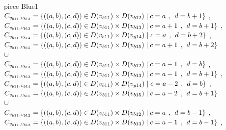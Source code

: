 \\ piece Blue1 
\\$C_{v_{b11},v_{b12}}=\{((a,b),(c,d))\in D(v_{b11}) \times D(v_{b12})\mid c = a   \hspace{1ex} , \hspace{1ex}  d = b + 1 \}$ , 
\\$C_{v_{b11},v_{b13}}=\{((a,b),(c,d))\in D(v_{b11}) \times D(v_{b13})\mid c = a + 1\hspace{1ex} , \hspace{1ex}  d = b + 1 \}$ , 
\\$C_{v_{b11},v_{b14}}=\{((a,b),(c,d))\in D(v_{b11}) \times D(v_{y14})\mid c = a   \hspace{1ex} , \hspace{1ex}  d = b + 2 \}$ , 
\\$C_{v_{b11},v_{b15}}=\{((a,b),(c,d))\in D(v_{b11}) \times D(v_{b15})\mid c = a + 1\hspace{1ex} , \hspace{1ex}  d = b + 2 \}$  
\\$\cup$
\\$C_{v_{b11},v_{b12}}=\{((a,b),(c,d))\in D(v_{b11}) \times D(v_{b12})\mid c = a - 1\hspace{1ex} , \hspace{1ex}  d = b    \}$ , 
\\$C_{v_{b11},v_{b13}}=\{((a,b),(c,d))\in D(v_{b11}) \times D(v_{b13})\mid c = a - 1\hspace{1ex} , \hspace{1ex}  d = b + 1 \}$ , 
\\$C_{v_{b11},v_{b14}}=\{((a,b),(c,d))\in D(v_{b11}) \times D(v_{y14})\mid c = a - 2\hspace{1ex} , \hspace{1ex}  d = b    \}$ , 
\\$C_{v_{b11},v_{b15}}=\{((a,b),(c,d))\in D(v_{b11}) \times D(v_{b15})\mid c = a - 2\hspace{1ex} , \hspace{1ex}  d = b + 1 \}$  
\\$\cup$
\\$C_{v_{b11},v_{b12}}=\{((a,b),(c,d))\in D(v_{b11}) \times D(v_{b12})\mid c = a  \hspace{1ex} , \hspace{1ex}  d = b - 1 \}$ , 
\\$C_{v_{b11},v_{b13}}=\{((a,b),(c,d))\in D(v_{b11}) \times D(v_{b13})\mid c = a - 1\hspace{1ex} , \hspace{1ex}  d = b - 1 \}$ , 
